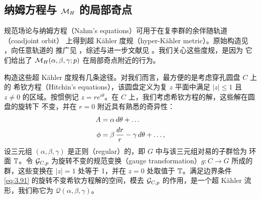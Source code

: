 

\subsection{\texorpdfstring{纳姆方程与 ${{\mathcal{M}}_H}$ 的局部奇点}{纳姆方程与 M_H 的局部奇点}}

\label{sec:3.8}

规范场论与纳姆方程（Nahm's equations）可用于在复李群的余伴随轨道（coadjoint orbit）
上得到超 Kähler 度规（hyper-Kähler metric）。原始构造见 \cite{ref34,ref35}，向任意轨道的
推广见 \cite{ref36,ref37}，综述与进一步文献见 \cite{ref63,ref31}。我们关心这些度规，是因为
它们给出了 ${{\mathcal{M}}_H}(\alpha,\beta,\gamma;p)$ 在局部奇点附近的行为。

构造这些超 Kähler 度规有几条途径。对我们而言，最方便的是考虑穿孔圆盘 $C$ 上的
希钦方程（Hitchin's equations），该圆盘定义为复 $z$ 平面中满足 $|z|\leq 1$ 且 $z\not= 0$
的区域。按惯例记 $z=re^{i\theta}$。在 $C$ 上，我们考虑希钦方程的解，这些解在圆盘的旋转下
不变，并在 $r=0$ 附近具有熟悉的奇异性：
\setcounter{equation}{90}
\begin{equation}\label{eq:3.91}
  \begin{aligned}A & = \alpha \,d\theta +\dots\\
           \phi & = \beta\,{dr\over r}-\gamma\,d\theta+\dots,\end{aligned}
\end{equation}
设三元组 $(\alpha,\beta,\gamma)$ 是正则（regular）的，即 $G$ 中与该三元组对易的子群恰为
环面 ${\mathbb{T}}$。令 $\mathcal{G}_{C,p}$ 为旋转不变的规范变换（gauge transformation）$g:C\to G$
所成的群，这些变换在 $|z|=1$ 处等于 1，并在 $z=0$ 处取值于 ${\mathbb{T}}$。满足边界条件
\eqref{eq:3.91} 的旋转不变希钦方程解的空间，模去 $\mathcal{G}_{C,p}$ 的作用，是一个超 Kähler
流形，我们称它为 ${\mathcal Q}(\alpha,\beta,\gamma)$。

